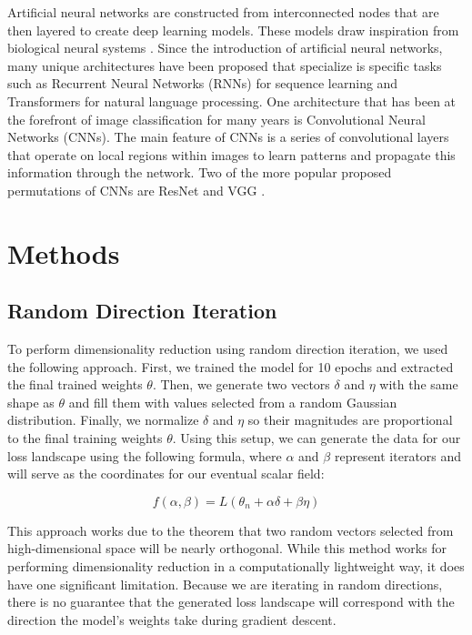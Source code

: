 \documentclass{acmsiggraph}
\begin{document}
Artificial neural networks are constructed from interconnected nodes that are then layered to create deep learning models. These models draw inspiration from biological neural systems \cite{https://doi.org/10.48550/arxiv.1511.08458}. Since the introduction of artificial neural networks, many unique architectures have been proposed that specialize is specific tasks such as Recurrent Neural Networks (RNNs) for sequence learning and Transformers for natural language processing. One architecture that has been at the forefront of image classification for many years is Convolutional Neural Networks (CNNs). The main feature of CNNs is a series of convolutional layers that operate on local regions within images to learn patterns and propagate this information through the network. Two of the more popular proposed permutations of CNNs are ResNet and VGG \cite{https://doi.org/10.48550/arxiv.1512.03385}. 

\section{Methods}
\label{sec:intro}
\subsection{Random Direction Iteration}
To perform dimensionality reduction using random direction iteration, we used the following approach. First, we trained the model for 10 epochs and extracted the final trained weights $\theta$. Then, we generate two vectors $\delta$ and $\eta$ with the same shape as $\theta$ and fill them with values selected from a random Gaussian distribution. Finally, we normalize $\delta$ and $\eta$ so their magnitudes are proportional to the final training weights $\theta$. Using this setup, we can generate the data for our loss landscape using the following formula, where $\alpha$ and $\beta$ represent iterators and will serve as the coordinates for our eventual scalar field:

\begin{equation} \label{eq1}
f(\alpha, \beta) = L(\theta_n + \alpha\delta + \beta\eta) 
\end{equation}

This approach works due to the theorem that two random vectors selected from high-dimensional space will be nearly orthogonal. While this method works for performing dimensionality reduction in a computationally lightweight way, it does have one significant limitation. Because we are iterating in random directions, there is no guarantee that the generated loss landscape will correspond with the direction the model's weights take during gradient descent. 
\end{document}
